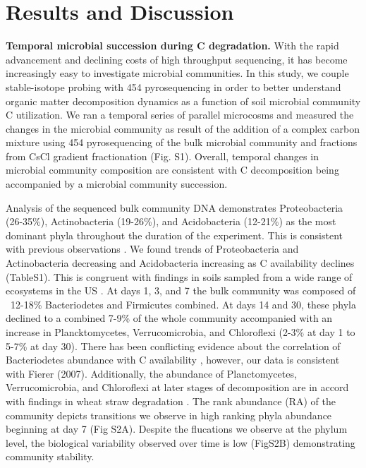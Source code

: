 \section{Results and Discussion}


\textbf{Temporal microbial succession during C degradation.} With the rapid advancement and declining costs of high throughput sequencing, it has become increasingly easy to investigate microbial communities.  In this study, we couple stable-isotope probing with 454 pyrosequencing in order to better understand organic matter decomposition dynamics as a function of soil microbial community C utilization. We ran a temporal series of parallel microcosms and measured the changes in the microbial community as result of the addition of a complex carbon mixture using 454 pyrosequencing of the bulk microbial community and fractions from CsCl gradient fractionation (Fig. S1). Overall, temporal changes in microbial community composition are consistent with C decomposition being accompanied by a microbial community succession. 

Analysis of the sequenced bulk community DNA demonstrates Proteobacteria (26-35\%), Actinobacteria (19-26\%), and Acidobacteria (12-21\%) as the most dominant phyla throughout the duration of the experiment. This is consistent with previous observations \cite{Goldfarb_2011, Fierer_2007, Rui_2009}. We found trends of Proteobacteria and Actinobacteria decreasing and Acidobacteria increasing as C availability declines (TableS1). This is congruent with findings in soils sampled from a wide range of ecosystems in the US \cite{Fierer_2007}. At days 1, 3, and 7 the bulk community was composed of ~12-18\% Bacteriodetes and Firmicutes combined.  At days 14 and 30, these phyla declined to a combined 7-9\% of the whole community accompanied with an increase in Plancktomycetes, Verrucomicrobia, and Chloroflexi (2-3\% at day 1 to 5-7\% at day 30). There has been conflicting evidence about the correlation of Bacteriodetes abundance with C availability \cite{Fierer_2007, Rui_2009, Sharp_2000}, however, our data is consistent with Fierer (2007).  Additionally, the abundance of Planctomycetes, Verrucomicrobia, and Chloroflexi at later stages of decomposition are in accord with findings in wheat straw degradation \cite{Bastian_2009}. The rank abundance (RA) of the community depicts transitions we observe in high ranking phyla abundance beginning at day 7 (Fig S2A).  Despite the flucations we observe at the phylum level, the biological variability observed over time is low (FigS2B) demonstrating community stability.   

